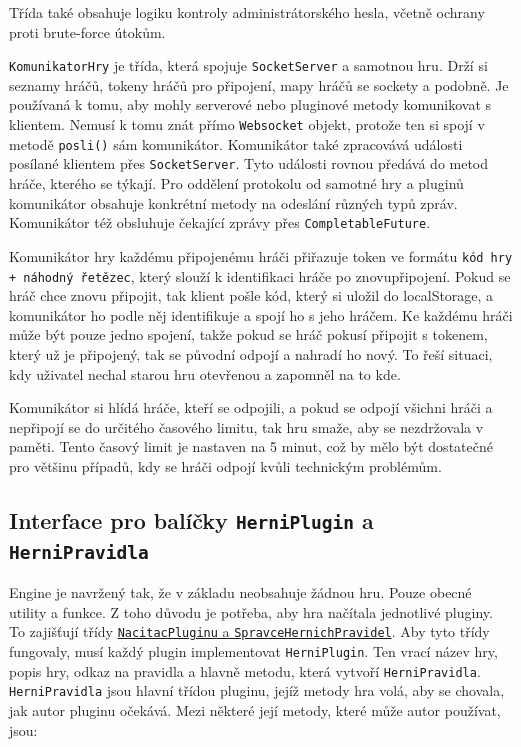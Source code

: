 Třída také obsahuje logiku kontroly administrátorského hesla, včetně ochrany proti brute-force útokům.

\texttt{KomunikatorHry} je třída, která spojuje \texttt{SocketServer} a samotnou hru. Drží si seznamy hráčů, tokeny hráčů pro připojení, mapy hráčů se sockety a podobně. Je používaná k tomu, aby mohly serverové nebo pluginové metody komunikovat s klientem. Nemusí k tomu znát přímo \texttt{Websocket} objekt, protože ten si spojí v metodě \texttt{posli()} sám komunikátor. Komunikátor také zpracovává události posílané klientem přes \texttt{SocketServer}. Tyto události rovnou předává do metod hráče, kterého se týkají. Pro oddělení protokolu od samotné hry a pluginů komunikátor obsahuje konkrétní metody na odeslání různých typů zpráv. Komunikátor též obsluhuje čekající zprávy přes \texttt{CompletableFuture}.

Komunikátor hry každému připojenému hráči přiřazuje token ve formátu \texttt{kód hry + náhodný řetězec}, který slouží k identifikaci hráče po znovupřipojení. Pokud se hráč chce znovu připojit, tak klient pošle kód, který si uložil do localStorage, a komunikátor ho podle něj identifikuje a spojí ho s jeho hráčem. Ke každému hráči může být pouze jedno spojení, takže pokud se hráč pokusí připojit s tokenem, který už je připojený, tak se původní odpojí a nahradí ho nový. To řeší situaci, kdy uživatel nechal starou hru otevřenou a zapomněl na to kde.

Komunikátor si hlídá hráče, kteří se odpojili, a pokud se odpojí všichni hráči a nepřipojí se do určitého časového limitu, tak hru smaže, aby se nezdržovala v paměti. Tento časový limit je nastaven na 5 minut, což by mělo být dostatečné pro většinu případů, kdy se hráči odpojí kvůli technickým problémům.

\hypertarget{HerniPlugin}{}\subsection{Interface pro balíčky \texttt{HerniPlugin} a \texttt{HerniPravidla}}
Engine je navržený tak, že v základu neobsahuje žádnou hru. Pouze obecné utility a funkce. Z toho důvodu je potřeba, aby hra načítala jednotlivé pluginy. To zajišťují třídy \hyperlink{nacitac-spravce}{\texttt{NacitacPluginu} a \texttt{SpravceHernichPravidel}}. Aby tyto třídy fungovaly, musí každý plugin implementovat \texttt{HerniPlugin}. Ten vrací název hry, popis hry, odkaz na pravidla a hlavně metodu, která vytvoří \texttt{HerniPravidla}. \texttt{HerniPravidla} jsou hlavní třídou pluginu, jejíž metody hra volá, aby se chovala, jak autor pluginu očekává. Mezi některé její metody, které může autor používat, jsou:
